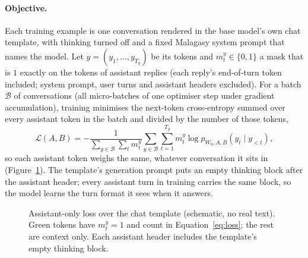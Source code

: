 \documentclass[11pt]{article}
\begin{document}
\paragraph{Objective.} Each training example is one conversation rendered in the base model's own chat
template, with thinking turned off and a fixed Malagasy system prompt that names the model. Let
$y=(y_1,\dots,y_{T_y})$ be its tokens and $m^{y}_t \in \{0,1\}$ a mask that is $1$ exactly on the tokens of assistant
replies (each reply's end-of-turn token included; system prompt, user turns and assistant headers
excluded). For a batch $\mathcal{B}$ of conversations (all micro-batches of one optimiser step under
gradient accumulation), training minimises the next-token cross-entropy summed over every assistant token
in the batch and divided by the number of those tokens,
\begin{equation}
  \mathcal{L}(A, B) = -\frac{1}{\sum_{y \in \mathcal{B}} \sum_{t} m^{y}_t}
  \sum_{y \in \mathcal{B}} \sum_{t=1}^{T_y} m^{y}_t \log p_{W_0, A, B}\left(y_t \mid y_{<t}\right),
  \label{eq:loss}
\end{equation}
so each assistant token weighs the same, whatever conversation it sits in (Figure~\ref{fig:mask}). The template's generation prompt puts an
empty thinking block after the assistant header; every assistant turn in training carries the same block,
so the model learns the turn format it sees when it answers.

\begin{figure}[t]
\centering
{}
\caption{Assistant-only loss over the chat template (schematic, no real text). Green tokens have
$m^{y}_t=1$ and count in Equation~\ref{eq:loss}; the rest are context only. Each assistant header includes
the template's empty thinking block.}
\label{fig:mask}
\end{figure}
\end{document}
